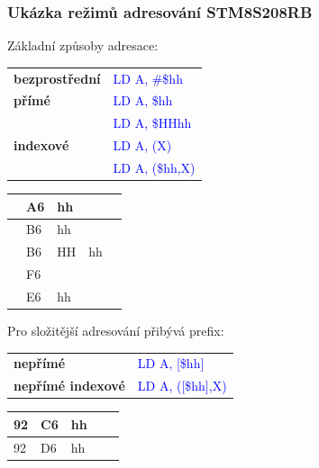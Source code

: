 	\begin{frame}
    \frametitle{Ukázka režimů adresování STM8S208RB}
		Základní způsoby adresace:
		
		\begin{center}
			\begin{tabular}{l l}
				\textbf{bezprostřední} & \textcolor{blue}{LD A, \#\$hh} \\
				\textbf{přímé} & \textcolor{blue}{LD A, \$hh} \\
				               & \textcolor{blue}{LD A, \$HHhh} \\
				\textbf{indexové} & \textcolor{blue}{LD A, (X)} \\
				                  & \textcolor{blue}{LD A, (\$hh,X)} \\
			\end{tabular}
			\begin{tabular}{| p{5mm} | p{5mm} | p{5mm} | p{5mm} | p{5mm} |}
			\hline
				& A6 & hh &  &  \\
			\hline
				& B6 & hh &  &  \\
			\hline
				& B6 & HH & hh &  \\
			\hline
			  & F6 & & &  \\
			\hline
			  & E6 & hh & &  \\
			\hline
			\end{tabular}
		\end{center}
		
		Pro složitější adresování přibývá prefix:
		
		\begin{center}
			\begin{tabular}{l l}
				\textbf{nepřímé} & \textcolor{blue}{LD A, [\$hh]} \\
				\textbf{nepřímé indexové} & \textcolor{blue}{LD A, ([\$hh],X)} \\
			\end{tabular}
			\begin{tabular}{| p{5mm} | p{5mm} | p{5mm} | p{5mm} | p{5mm} |}
			\hline
				92 & C6 & hh &  &  \\
			\hline
				92 & D6 & hh &  &  \\
			\hline
			\end{tabular}
		\end{center}

	\end{frame}
	

